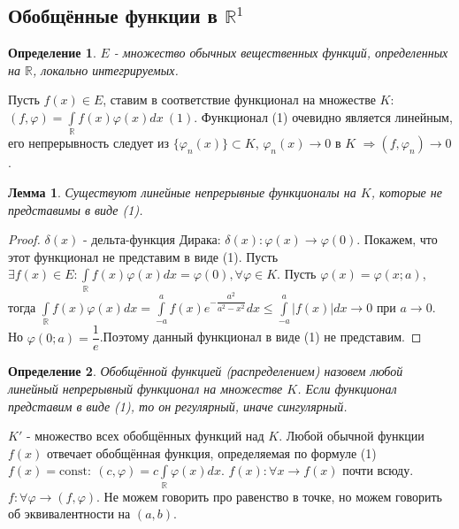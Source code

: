\documentclass[9pt, a4paper]{article}
\newtheorem*{lemma}{Лемма}
\newtheorem*{definition}{Определение}
\begin{document}
		\subsection{Обобщённые функции в $\mathbb{R}^1$}
			\begin{definition}
				$E$ - множество обычных вещественных функций, определенных на $\mathbb{R}$, локально интегрируемых.
			\end{definition}
			Пусть $f(x) \in E$, ставим в соответствие функционал на множестве $K$: $(f, \varphi) = \int\limits_{\mathbb{R}} f(x) \varphi(x) dx \ (1)$.\newline
			Функционал (1) очевидно является линейным, его непрерывность следует из $\{\varphi_n(x)\} \subset K$, $\varphi_n(x) \to 0$ в $K$ $\Rightarrow (f, \varphi_n) \to 0$. 
			\begin{lemma}
				Существуют линейные непрерывные функционалы на $K$, которые не представимы в виде (1).
			\end{lemma}
			\begin{proof}
				$\delta(x)$ - дельта-функция Дирака: $\delta(x): \varphi(x) \to \varphi(0)$. Покажем, что этот функционал не представим в виде (1). Пусть $\exists f(x) \in E: \int\limits_{\mathbb{R}} f(x)\varphi(x) dx = \varphi(0), \forall \varphi \in K$. Пусть $\varphi(x) = \varphi(x; a)$, тогда $\int\limits_{\mathbb{R}} f(x) \varphi(x) dx = \int\limits_{-a}^{a} f(x) e^{-\dfrac{a^2}{a^2 - x^2}} dx \leq \int\limits_{-a}^{a} |f(x)| dx \to 0 $ при $a \to 0$. Но $\varphi(0; a) = \dfrac{1}{e}$.Поэтому данный функционал в виде (1) не представим.
			\end{proof}
			\begin{definition}
				Обобщённой функцией (распределением) назовем любой линейный непрерывный функционал на множестве $K$. Если функционал представим в виде (1), то он регулярный, иначе сингулярный.
			\end{definition}
			$K'$ - множество всех обобщённых функций над $K$. \newline
			Любой обычной функции $f(x)$ отвечает обобщённая функция, определяемая по формуле (1) $f(x) = \mathrm{const}: \ (c,\varphi) = c \int\limits_{\mathbb{R}} \varphi(x) dx$. $f(x): \forall x \to f(x)$ почти всюду. $f: \forall \varphi \to (f, \varphi)$. Не можем говорить про равенство в точке, но можем говорить об эквивалентности на $(a,b)$.
\end{document}
